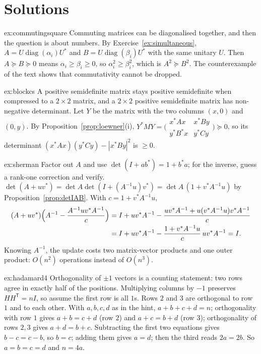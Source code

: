 \section{Solutions}

\begin{solution}{ex:commutingsquare}
\idea Commuting matrices can be diagonalised together, and then the question is about numbers.
\writeup By Exercise~\ref{ex:simultaneous}, $A=U\operatorname{diag}(\alpha_i)U^*$ and $B=U\operatorname{diag}(\beta_i)U^*$ with the same
unitary $U$. Then $A\succeq B\succeq0$ means $\alpha_i\ge\beta_i\ge0$, so $\alpha_i^2\ge\beta_i^2$, which is $A^2\succeq B^2$. The
counterexample of the text shows that commutativity cannot be dropped.
\end{solution}

\begin{solution}{ex:blockcs}
\idea A positive semidefinite matrix stays positive semidefinite when compressed to a $2\times2$ matrix, and a $2\times2$ positive
semidefinite matrix has non-negative determinant.
\writeup Let $Y$ be the matrix with the two columns $(x,0)$ and $(0,y)$. By Proposition~\ref{prop:loewner}(i), $Y^*MY=\bigl(\begin{smallmatrix}
x^*Ax&x^*By\\y^*B^*x&y^*Cy\end{smallmatrix}\bigr)\succeq0$, so its determinant $(x^*Ax)(y^*Cy)-|x^*By|^2$ is $\ge0$.
\end{solution}

\begin{solution}{ex:sherman}
\idea Factor out $A$ and use $\det(I+ab^*)=1+b^*a$; for the inverse, guess a rank-one correction and verify.
\writeup $\det(A+uv^*)=\det A\det(I+(A^{-1}u)v^*)=\det A\,(1+v^*A^{-1}u)$ by Proposition~\ref{prop:detIAB}. With $c=1+v^*A^{-1}u$,
\[
\begin{aligned}
(A+uv^*)\Bigl(A^{-1}-\frac{A^{-1}uv^*A^{-1}}c\Bigr)&=I+uv^*A^{-1}-\frac{uv^*A^{-1}+u(v^*A^{-1}u)v^*A^{-1}}c\\
&=I+uv^*A^{-1}-\frac{1+v^*A^{-1}u}c\,uv^*A^{-1}=I.
\end{aligned}
\]
Knowing $A^{-1}$, the update costs two matrix-vector products and one outer product: $O(n^2)$ operations instead of $O(n^3)$.
\end{solution}

\begin{solution}{ex:hadamard4}
\idea Orthogonality of $\pm1$ vectors is a counting statement: two rows agree in exactly half of the positions.
\writeup Multiplying columns by $-1$ preserves $HH^{\mathsf T}=nI$, so assume the first row is all $1$s. Rows $2$ and $3$ are orthogonal to
row $1$ and to each other. With $a,b,c,d$ as in the hint, $a+b+c+d=n$; orthogonality with row $1$ gives $a+b=c+d$ (row $2$) and $a+c=
b+d$ (row $3$); orthogonality of rows $2,3$ gives $a+d=b+c$. Subtracting the first two equations gives $b-c=c-b$, so $b=c$; adding them gives $a=d$; then
the third reads $2a=2b$. So $a=b=c=d$ and $n=4a$.
\end{solution}


